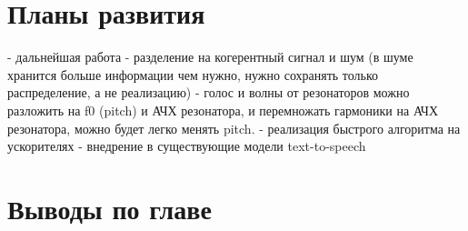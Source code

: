 \section{Планы развития}
\begin{markdown}
 - дальнейшая работа
   - разделение на когерентный сигнал и шум (в шуме хранится больше информации чем нужно, нужно сохранять только распределение, а не реализацию)
   - голос и волны от резонаторов можно разложить на f0 (pitch) и АЧХ резонатора, и перемножать гармоники на АЧХ резонатора, можно будет легко менять pitch.
   - реализация быстрого алгоритма на ускорителях
   - внедрение в существующие модели text-to-speech
\end{markdown}

\section{Выводы по главе}